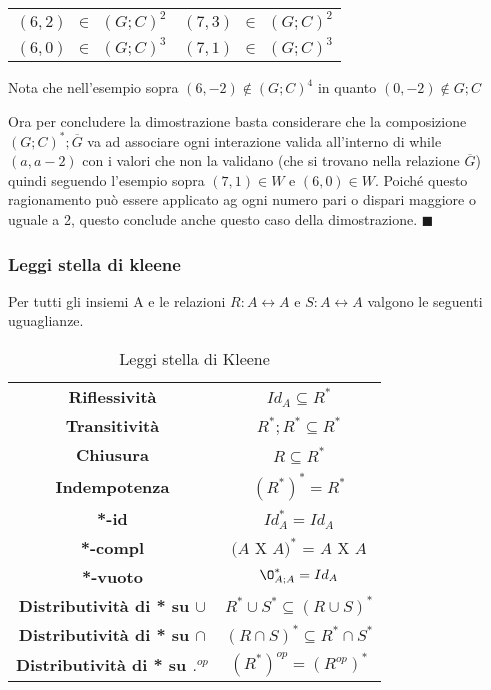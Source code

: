 \begin{demostration}
\begin{table}[h!]
\begin{tabular}{c c}
            $(6,2) \: \: \in \: \: (G;C)^2$ & $(7,3) \: \: \in \: \: (G;C)^2$  \\
            $(6,0) \: \: \in \: \: (G;C)^3$ & $(7,1) \: \: \in \: \: (G;C)^3$ 
        \end{tabular}
    \end{table}
    \begin{note}
    \vspace{-10pt}
    Nota che nell'esempio sopra $(6, -2) \notin (G;C)^4$ in quanto $(0, -2) \notin G;C$
    \end{note}
    Ora per concludere la dimostrazione basta considerare che la composizione $(G;C)^*;\overline{G}$ va ad associare ogni interazione valida all'interno di while $(a,a-2)$ con i valori che non la validano (che si trovano nella relazione $\overline{G}$) quindi seguendo l'esempio sopra $(7,1) \in W$ e $(6,0) \in W$. Poiché questo ragionamento può essere applicato ag ogni numero pari o dispari maggiore o uguale a 2, questo conclude anche questo caso della dimostrazione. $\blacksquare$
\end{demostration}

\subsubsection{Leggi stella di kleene}
Per tutti gli insiemi A e le relazioni $R: A \longleftrightarrow A$ e $S: A \longleftrightarrow A$ valgono le seguenti uguaglianze.
\begin{table}[h!]
    \centering
    \setlength{\tabcolsep}{10pt}
    \renewcommand{\arraystretch}{1.3}
    \begin{tabular}{|c|c|}
        \hline
        \textbf{Riflessività} & $Id_A \subseteq R^*$ \\
        \textbf{Transitività} & $R^*;R^* \subseteq R^*$ \\
        \textbf{Chiusura} & $R \subseteq R^*$ \\
        \textbf{Indempotenza} & $(R^*)^* = R^*$ \\
        \textbf{*-id} & $Id_A^* = Id_A$ \\
        \textbf{*-compl} & $(A$ X $A)^*$ = $A$ X $A$  \\
        \textbf{*-vuoto} & $\O_{A;A}^* = Id_A$ \\
        \textbf{Distributività di * su $\cup$} & $R^* \cup S^* \subseteq (R \cup S)^*$ \\
        \textbf{Distributività di * su $\cap$} & $(R \cap S)^* \subseteq R^* \cap S^*$ \\
        \textbf{Distributività di * su $.^{op}$} & $(R^*)^{op} = (R^{op})^*$ \\
        \hline
    \end{tabular}
    \caption{Leggi stella di Kleene}
    \label{tab:leggi-stella-kleene}
\end{table}

